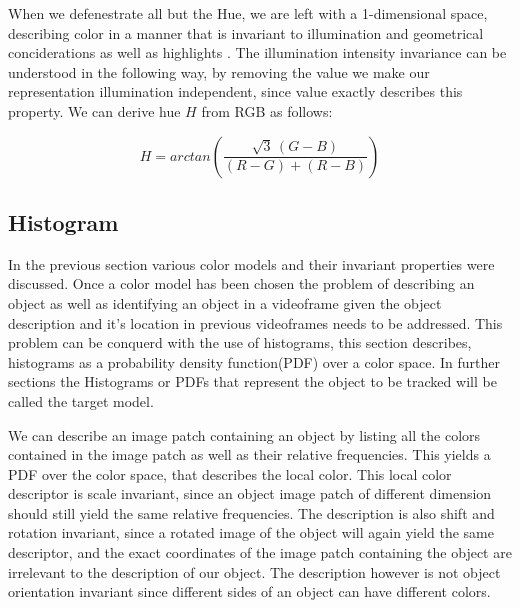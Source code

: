 \documentclass[a4paper,11pt]{article}
\begin{document}
When we defenestrate all but the Hue, we are left with a 1-dimensional space, describing color in a manner that is invariant to illumination and geometrical conciderations as well as highlights \cite{gevers_invariant}. The illumination intensity invariance can be understood in the following way, by removing the value we make our representation illumination independent, since value exactly describes this property. We can derive hue $H$ from RGB as follows:

\begin{equation}
\label{eq:hue}
H = arctan\left(\frac{\sqrt{3}\,(G-B)}{(R-G)+(R-B)}\right)
\end{equation} 
		 
\subsection{Histogram}
In the previous section various color models and their invariant properties were discussed. Once a color model has been chosen the problem of describing an object as well as identifying an object in a videoframe given the object description and it's location in previous videoframes needs to be addressed. This problem can be conquerd with the use of histograms, this section describes, histograms as a probability density function(PDF) over a color space. In further sections the Histograms or PDFs that represent the object to be tracked will be called the target model.

We can describe an image patch containing an object by listing all the colors contained in the image patch as well as their relative frequencies. This yields a PDF over the color space, that describes the local color. This local color descriptor is scale invariant, since an object image patch of different dimension should still yield the same relative frequencies. The description is also shift and rotation invariant, since a rotated image of the object will again yield the same descriptor, and the exact coordinates of the image patch containing the object are irrelevant to the description of our object. The description however is not object orientation invariant since different sides of an object can have different colors. 
\end{document}
